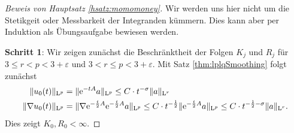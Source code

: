 \begin{proof}[Beweis von Hauptsatz \ref{hsatz:momomoney}]
  Wir werden uns hier nicht um die Stetikgeit oder Messbarkeit der Integranden kümmern. Dies kann aber per Induktion als Übungsaufgabe bewiesen werden.

  \textbf{Schritt 1}: Wir zeigen zunächst die  Beschränktheit der Folgen $K_j$ und $R_j$ für $3 \leq r < p < 3 + \varepsilon$ und $3 < r \leq p < 3 + \varepsilon$.
  Mit Satz \ref{thm:lplqSmoothing} folgt zunächst
  \begin{align*}
    \|u_0(t) \|_{\mathrm{L}^p} &= \|\mathrm{e}^{-t A} a \|_{\mathrm{L}^p} \leq C \cdot t^{-\sigma} \|a\|_{\mathrm{L}^r} \\
    \|\nabla u_0(t) \|_{\mathrm{L}^p} &= \|\nabla \mathrm{e}^{-\frac{t}{2} A} \mathrm{e}^{-\frac{t}{2} A} a \|_{\mathrm{L}^p} \leq C\cdot t^{-\frac{1}{2}} \|\mathrm{e}^{-\frac{t}{2} A} a \|_{\mathrm{L}^p} \leq C\cdot t^{-\frac{1}{2}   - \sigma} \|a\|_{\mathrm{L}^r}.
  \end{align*}
  Dies zeigt $K_0, R_0 < \infty$.


\end{proof}
